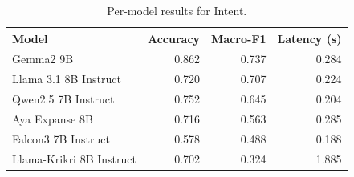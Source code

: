 \begin{table}[t]
\centering
\caption{Per-model results for Intent.}
\label{tab:appendix-intent-classification-analysis}
\begin{tabular}{lrrr}
\toprule
Model & Accuracy & Macro-F1 & Latency (s) \\
\midrule
Gemma2 9B & 0.862 & 0.737 & 0.284 \\
Llama 3.1 8B Instruct & 0.720 & 0.707 & 0.224 \\
Qwen2.5 7B Instruct & 0.752 & 0.645 & 0.204 \\
Aya Expanse 8B & 0.716 & 0.563 & 0.285 \\
Falcon3 7B Instruct & 0.578 & 0.488 & 0.188 \\
Llama-Krikri 8B Instruct & 0.702 & 0.324 & 1.885 \\
\bottomrule
\end{tabular}
\end{table}
